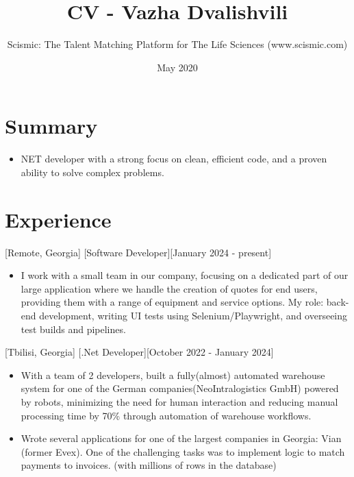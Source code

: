 \documentclass[11pt]{article}
\title{CV - Vazha Dvalishvili}
\author{Scismic: The Talent Matching Platform for The Life Sciences (www.scismic.com)}
\date{May 2020}
\begin{document}

\makecvtitle %

\section{Summary}
\begin{itemize}
\item NET developer with a strong focus on clean, efficient code, and a proven ability to solve complex problems.
\end{itemize}
 
 \section{Experience}

[Remote, Georgia]
[Software Developer][January 2024 - present]

\begin{itemize}
\item 
I work with a small team in our company, focusing on a dedicated part of our large application where we handle the creation of quotes for end users, providing them with a range of equipment and service options. My role: back-end development, writing UI tests using Selenium/Playwright, and overseeing test builds and pipelines.

\end{itemize}

[Tbilisi, Georgia]
[.Net Developer][October 2022 - January 2024]

\begin{itemize}
\item With a team of 2 developers, built a fully(almost) automated warehouse system for one of the German companies(NeoIntralogistics GmbH) powered by robots, minimizing the need for human interaction and reducing manual processing time by 70\% through automation of warehouse workflows. 
\end{itemize}
\begin{itemize}
\item Wrote several applications for one of the largest companies in Georgia: Vian (former Evex). One of the challenging tasks was to implement logic to match payments to invoices. (with millions of rows in the database)
\end{itemize}
\end{document}
